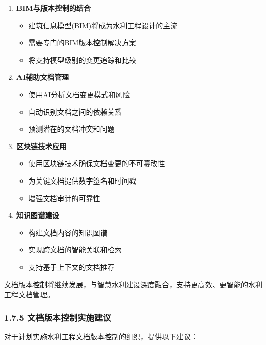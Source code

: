 \begin{enumerate}
\def\labelenumi{\arabic{enumi}.}
\tightlist
\item
  \textbf{BIM与版本控制的结合}

  \begin{itemize}
  \tightlist
  \item
    建筑信息模型(BIM)将成为水利工程设计的主流
  \item
    需要专门的BIM版本控制解决方案
  \item
    将支持模型级别的变更追踪和比较
  \end{itemize}
\item
  \textbf{AI辅助文档管理}

  \begin{itemize}
  \tightlist
  \item
    使用AI分析文档变更模式和风险
  \item
    自动识别文档之间的依赖关系
  \item
    预测潜在的文档冲突和问题
  \end{itemize}
\item
  \textbf{区块链技术应用}

  \begin{itemize}
  \tightlist
  \item
    使用区块链技术确保文档变更的不可篡改性
  \item
    为关键文档提供数字签名和时间戳
  \item
    增强文档审计的可靠性
  \end{itemize}
\item
  \textbf{知识图谱建设}

  \begin{itemize}
  \tightlist
  \item
    构建文档内容的知识图谱
  \item
    实现跨文档的智能关联和检索
  \item
    支持基于上下文的文档推荐
  \end{itemize}
\end{enumerate}

文档版本控制将继续发展，与智慧水利建设深度融合，支持更高效、更智能的水利工程文档管理。

\subsubsection{1.7.5
文档版本控制实施建议}\label{ux6587ux6863ux7248ux672cux63a7ux5236ux5b9eux65bdux5efaux8bae}

对于计划实施水利工程文档版本控制的组织，提供以下建议：

